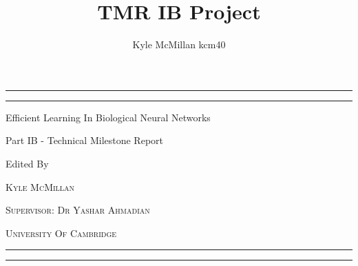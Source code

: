 \documentclass[a4paper, 11pt, oneside]{report}
\author{Kyle McMillan kcm40}
\title{TMR IB Project}
\begin{document}
\thispagestyle{firstpage}
\begingroup
\centering %

{\scshape %


\rule{\textwidth}{1.6pt}\vspace*{-\baselineskip}\vspace*{2pt} %
\rule{\textwidth}{0.4pt} %

\vspace{0.75\baselineskip} %

{\LARGE Efficient Learning In Biological Neural Networks} %

\vspace{0.75\baselineskip} %


Part IB - Technical Milestone Report %

\vspace*{1\baselineskip} %


Edited By

\vspace{0.5\baselineskip} %

{\scshape\Large Kyle McMillan} %

\vspace{0.5\baselineskip} %

\textsc{Supervisor: Dr Yashar Ahmadian} %

\vspace{0.5\baselineskip} %

\textsc{University Of Cambridge} %

\vspace{0.75\baselineskip} %

\rule{\textwidth}{0.4pt}\vspace*{-\baselineskip}\vspace{3.2pt} %
\rule{\textwidth}{1.6pt} %
}
\end{document}
